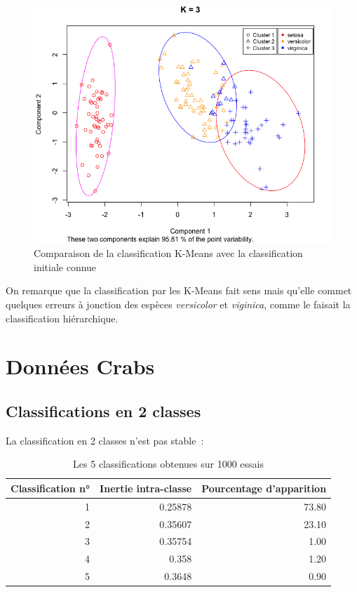 \documentclass[a4paper,10pt]{report}
\begin{document}
\begin{figure}[H]
	\centering
	\captionsetup{justification=centering}
	\includegraphics[width=.7\linewidth]{img/3-1-2-iris-kmeans-3-min-inertie}
	\caption{\small Comparaison de la classification K-Means avec la classification initiale connue}
	\label{fig:3-1-4-comparaison-classif-kmeans-vs-connue}
\end{figure}%

On remarque que la classification par les K-Means fait sens mais qu'elle commet quelques erreurs à jonction des espèces \textit{versicolor} et \textit{viginica}, comme le faisait la classification hiérarchique.





\section{Données Crabs}

\subsection{Classifications en 2 classes}

La classification en 2 classes n'est pas stable~:

\begin{table}[H]
	\centering
	\captionsetup{justification=centering, margin=3cm}
	\begin{tabular}{r|r|r}
		Classification n° & Inertie intra-classe & Pourcentage d'apparition \\
		\hline
		1 & 0.25878 & 73.80 \\ 
		2 & 0.35607 & 23.10 \\ 
		3 & 0.35754 & 1.00 \\ 
		4 & 0.358 & 1.20 \\ 
		5 & 0.3648 & 0.90 \\ 
	\end{tabular}
	\caption{Les 5 classifications obtenues sur 1000 essais}
	
\end{table}
\end{document}
